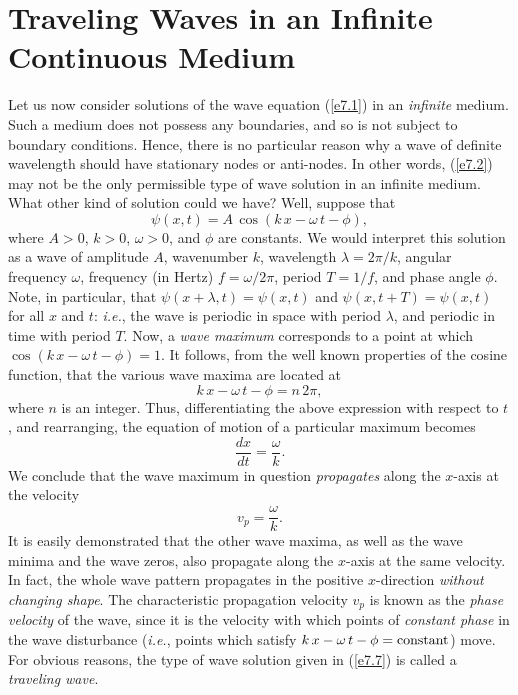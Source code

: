 \section{Traveling Waves in an Infinite Continuous Medium}\label{s7.2}
Let us now consider solutions of the wave equation (\ref{e7.1}) in an {\em infinite}\/ medium. Such a medium does not possess any boundaries, and so  is not
subject to  boundary conditions. Hence, there is no particular reason why a
wave of definite wavelength should  have stationary nodes or anti-nodes. In other
words, (\ref{e7.2}) may not be the only permissible type of wave solution in an
infinite medium. What other kind of solution could we have? Well, suppose that
\begin{equation}\label{e7.7}
\psi(x,t) = A\,\cos(k\,x-\omega\,t-\phi),
\end{equation}
where $A>0$, $k>0$, $\omega>0$, and $\phi$ are constants. We would interpret
this solution as a wave of amplitude $A$, wavenumber $k$, wavelength $\lambda=2\pi/k$, angular frequency $\omega$, frequency (in Hertz) $f=\omega/2\pi$, period $T=1/f$, and phase angle $\phi$. Note, in particular, that $\psi(x+\lambda,t)=\psi(x,t)$ and $\psi(x,t+T)=\psi(x,t)$
for all $x$ and $t$: {\em i.e.}, the wave is periodic in space with period $\lambda$,
and  periodic in time with period $T$. Now, a {\em wave maximum}\/ corresponds to
a point at which $\cos(k\,x-\omega\,t-\phi)=1$. It follows, from the well known
properties of the cosine function, that the various wave maxima are located at
\begin{equation}
k\,x-\omega\,t-\phi = n\,2\pi,
\end{equation}
where $n$ is an integer. Thus, differentiating the above expression with respect to $t$,
and rearranging, the equation of motion of a particular maximum becomes
\begin{equation}
\frac{dx}{dt}=\frac{\omega}{k}.
\end{equation}
We conclude that the wave maximum in question {\em propagates}\/ along the $x$-axis at the
velocity
\begin{equation}
v_p = \frac{\omega}{k}.
\end{equation}
It is easily demonstrated that the other wave maxima, as well as the wave minima and  the wave zeros, also propagate
along the $x$-axis at the same velocity. In fact, the whole wave pattern
propagates in the positive $x$-direction  {\em without changing shape}. The  characteristic propagation velocity $v_p$ is known as the {\em phase velocity}\/ of the wave, since
it is the velocity with which points  of {\em constant phase}\/ in the wave disturbance ({\em i.e.}, points which satisfy $k\,x-\omega\,t-\phi = {\rm constant}$) move. For obvious reasons, the type of wave solution given in (\ref{e7.7}) is called a {\em traveling
wave}. 

